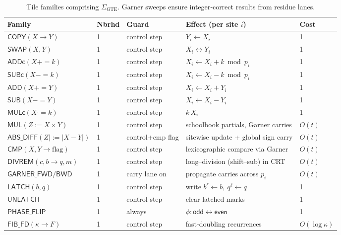 \documentclass[12pt]{article}
\numberwithin{equation}{section}
\begin{document}
\begin{table}[H]
\centering
\renewcommand{\arraystretch}{1.13}
\small\begin{tabular}{@{}lp{2.2cm}p{2.4cm}p{4.6cm}l@{}}
\toprule
Family & Nbrhd & Guard & Effect (per site \(i\)) & Cost \\
\midrule
\(\mathsf{COPY}(X\to Y)\)   & 1 & control step & \(Y_i \gets X_i\) & 1 \\
\(\mathsf{SWAP}(X,Y)\)      & 1 & control step & \(X_i \leftrightarrow Y_i\) & 1 \\
\(\mathsf{ADDc}(X{+}{=}k)\) & 1 & control step & \(X_i \gets X_i + k \bmod p_i\) & 1 \\
\(\mathsf{SUBc}(X{-}{=}k)\) & 1 & control step & \(X_i \gets X_i - k \bmod p_i\) & 1 \\
\(\mathsf{ADD}(X{+}{=}Y)\)  & 1 & control step & \(X_i \gets X_i + Y_i\) & 1 \\
\(\mathsf{SUB}(X{-}{=}Y)\)  & 1 & control step & \(X_i \gets X_i - Y_i\) & 1 \\
\(\mathsf{MULc}(X{\cdot}{=}k)\) & 1 & control step & \(k\,X_i\) & 1 \\
\(\mathsf{MUL}(Z{:=}X\!\times\!Y)\) & 1 & control step & schoolbook partials, Garner carries & \(O(t)\) \\
\(\mathsf{ABS\_DIFF}(Z{|}{:=}|X{-}Y|)\) & 1 & control+cmp flag & sitewise update + global sign carry & \(O(t)\) \\
\(\mathsf{CMP}(X,Y\to \text{flag})\) & 1 & control step & lexicographic compare via Garner & \(O(t)\) \\
\(\mathsf{DIVREM}(c,b\to q,m)\) & 1 & control step & long–division (shift–sub) in CRT & \(O(t)\) \\
\(\mathsf{GARNER\_FWD/BWD}\) & 1 & carry lane on & propagate carries across \(p_i\) & \(O(t)\) \\
\(\mathsf{LATCH}(b,q)\)     & 1 & control step & write \(b^\ell\!\gets b,\ q^\ell\!\gets q\) & 1 \\
\(\mathsf{UNLATCH}\)        & 1 & control step & clear latched marks & 1 \\
\(\mathsf{PHASE\_FLIP}\)    & 1 & always & \(\phi:\textsf{odd}\leftrightarrow\textsf{even}\) & 1 \\
\(\mathsf{FIB\_FD}(\kappa\to F)\) & 1 & control step & fast‑doubling recurrences & \(O(\log\kappa)\) \\
\bottomrule
\end{tabular}%
\caption{Tile families comprising \(\Sigma_{\mathrm{GTE}}\). Garner sweeps ensure integer‑correct results from residue lanes.}
\label{tab:sigma-gte}
\end{table}
\end{document}
